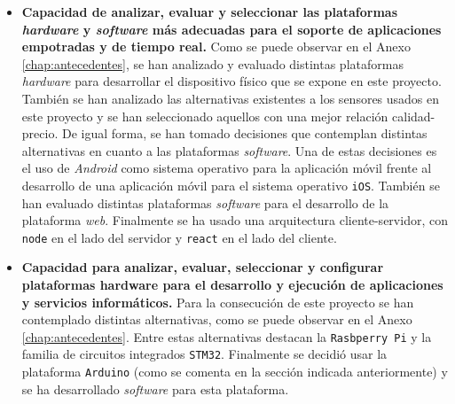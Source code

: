 \begin{itemize}
\item \textbf{Capacidad de analizar, evaluar y seleccionar las plataformas \textit{hardware} y \textit{software} más adecuadas para el soporte de aplicaciones empotradas y de tiempo real.} Como se puede observar en el Anexo \ref{chap:antecedentes}, se han analizado y evaluado distintas plataformas \textit{hardware} para desarrollar el dispositivo físico que se expone en este proyecto. También se han analizado las alternativas existentes a los sensores usados en este proyecto y se han seleccionado aquellos con una mejor relación calidad-precio.  De igual forma, se han tomado decisiones que contemplan distintas alternativas en cuanto a las plataformas \textit{software}. Una de estas decisiones es el uso de \textit{Android} como sistema operativo para la aplicación móvil frente al desarrollo de una aplicación móvil para el sistema operativo \texttt{iOS}. También se han evaluado distintas plataformas \textit{software} para el desarrollo de la plataforma \textit{web}. Finalmente se ha usado una arquitectura cliente-servidor, con \texttt{node} en el lado del servidor y \texttt{react} en el lado del cliente.

\item \textbf{Capacidad para analizar, evaluar, seleccionar y configurar plataformas hardware para el desarrollo y ejecución de aplicaciones y servicios informáticos.} Para la consecución de este proyecto se han contemplado distintas alternativas, como se puede observar en el Anexo \ref{chap:antecedentes}. Entre estas alternativas destacan la \texttt{Rasbperry Pi} y la familia de circuitos integrados \texttt{STM32}. Finalmente se decidió usar la plataforma \texttt{Arduino} (como se comenta en la sección indicada anteriormente) y se ha desarrollado \textit{software} para esta plataforma.

\end{itemize}